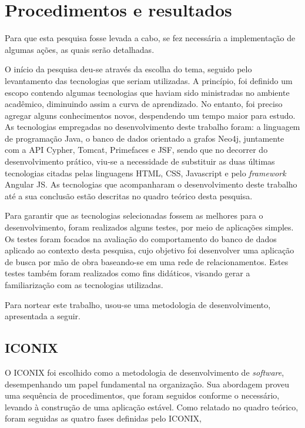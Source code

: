 \section{Procedimentos e resultados}

\par Para que esta pesquisa fosse levada a cabo, se fez necessária a implementação de algumas ações, as quais serão detalhadas.

\par O início da pesquisa deu-se através da escolha do tema, seguido pelo levantamento das tecnologias que seriam utilizadas. A princípio, foi definido um escopo contendo algumas tecnologias que haviam sido ministradas no ambiente acadêmico, diminuindo assim a curva de aprendizado. No entanto, foi preciso agregar alguns conhecimentos novos, despendendo um tempo maior para estudo. As tecnologias empregadas no desenvolvimento deste trabalho foram: a linguagem de programação Java, o banco de dados orientado a grafos Neo4j, juntamente com a API Cypher, Tomcat, Primefaces e JSF, sendo que no decorrer do desenvolvimento prático, viu-se a necessidade de substituir as duas últimas tecnologias citadas pelas linguagens HTML, CSS, Javascript e pelo \textit{framework} Angular JS. As tecnologias que acompanharam o desenvolvimento deste trabalho até a sua conclusão estão descritas no quadro teórico desta pesquisa.

\par Para garantir que as tecnologias selecionadas fossem as melhores para o desenvolvimento, foram realizados alguns testes, por meio de aplicações simples. Os testes foram focados na avaliação do comportamento do banco de dados aplicado ao contexto desta pesquisa, cujo objetivo foi desenvolver uma aplicação de busca por mão de obra baseando-se em uma rede de relacionamentos. Estes testes também foram realizados como fins didáticos, visando gerar a familiarização com as tecnologias utilizadas.

\par Para nortear este trabalho, usou-se uma metodologia de desenvolvimento, apresentada a seguir.

\subsection{ICONIX}

\par O ICONIX foi escolhido como a metodologia de desenvolvimento de \textit{software}, desempenhando um papel fundamental na organização. Sua abordagem proveu uma sequência de procedimentos, que foram seguidos conforme o necessário, levando à construção de uma aplicação estável. Como relatado no quadro teórico, foram seguidas as quatro fases definidas pelo ICONIX,

